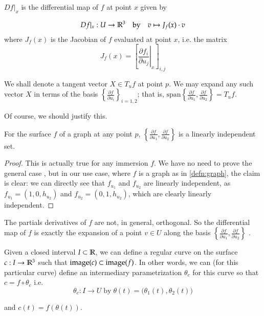         \begin{defn} \label{defn:differential-map}
        	$Df\vert_x$ is the differential map of $f$ at point $x$ given by
        
        \[
	        Df|_x : U \to \mathbb{R}^3 \quad \textrm{by} \quad v \mapsto J_f (x) \cdot v
        \]
	  where  $J_f(x)$ is the Jacobian of $f$ evaluated at point $x$, i.e. the matrix
	  \[
	  J_f (x) = \left[ \left.\frac{\partial f_i}{\partial u_j}\right\vert_x \right]_{i,j}
	  \]
	\end{defn}
	  We shall denote a tangent vector $X \in T_u f$ at point $p$. We may expand any such vector $X$ in terms of the basis $\left\{ \frac{\partial f}{\partial u_i}\right\}_{i=1,2}$; that is,
	  $\textrm{span}\left\{ \frac{\partial f}{\partial u_1}, \frac{\partial f}{\partial u_2}\right\} = T_u f$. 
	  
	  Of course, we should justify this.  
	  \begin{lemma} \label{lemma:f_ui-is-a-basis}
	  	For the surface $f$ of a graph at any point $p$, $\left\{\frac{\partial f}{\partial u_1} , \frac{\partial f}{\partial u_2}\right\}$ is a linearly independent set.
	  \end{lemma}
	 \begin{proof}
	  This is actually true for any immersion $f$. We have no need to prove the general case , but
	  in our use case, where $f$ is a graph as in \cref{defn:graph}, the claim is clear: we can directly see that $f_{u_1}$ and $f_{u_2}$ are linearly independent, as $f_{u_1} = (1,0,h_{u_2})$ and $f_{u_2} = (0,1,h_{u_2})$, which are clearly linearly independent. \end{proof}
		The partials derivatives of $f$ are not, in general, orthogonal.
	  	So the differential map of $f$ is exactly the expansion of
	  	a point  $v \in U$ along the basis
	  	$\left\{\frac{\partial f}{\partial u_1} , \frac{\partial f}{\partial u_2}\right\}$ .

	  	
	  	\begin{defn} \label{defn:curve-on-a-surface}
	  Given a closed interval $I \subset \mathbb{R}$, we can define a regular curve on the surface
	  $c: I \to \mathbb{R}^3$ such that $\mathrm{image}(c) \subset \mathrm{image}(f)$. In other words, we can (for this particular curve) define an intermediary parametrization $\theta_c$ for this curve so that
      $ c = f \circ \theta_c $ i.e.
	  \[
	  \theta_c : I \to U \; \textrm{by} \; \theta(t) = \big(\theta_1(t), \theta_2(t)\big)
	  \]
	  
	  and $c(t) = f(\theta(t))$.
	\end{defn}
	  
